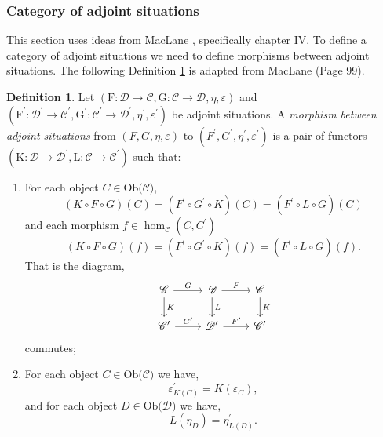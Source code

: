 \documentclass[11pt,a4paper]{article}
\theoremstyle{definition}
\newtheorem{definition}[thm]{Definition}
\newcommand\ho[3][]{\hom_{#1}(#2,#3)}
\newcommand\ob[1]{\mathrm{Ob(}#1\mathrm{)}}
\newcommand\cat[1]{\mathscr{#1}}
\newcommand\func[3]{\mathrm{#1}\colon#2\rightarrow#3}
\numberwithin{equation}{section}
\begin{document}
\subsubsection{Category of adjoint situations}
\label{sss:catofadjsitu} 
This section uses ideas from MacLane \cite{MacLane}, specifically chapter IV. To define a category of adjoint situations we need to define morphisms between adjoint situations. The following Definition \ref{def:morphadjsitu} is adapted from MacLane \cite{MacLane} (Page 99).

\begin{definition}
    \label{def:morphadjsitu}
    Let $(\func{F}{\cat{D}}{\cat{C}},\func{G}{\cat{C}}{\cat{D}},\eta,\varepsilon)$ and $(\func{F^\prime}{\cat{D^\prime}}{\cat{C^\prime}},\func{G^\prime}{\cat{C^\prime}}{\cat{D^\prime}},\eta^\prime,\varepsilon^\prime)$ be adjoint situations. A \emph{morphism between adjoint situations} from $(F,G,\eta,\varepsilon)$ to $(F^\prime,G^\prime,\eta^\prime,\varepsilon^\prime)$ is a pair of functors $(\func{K}{\cat{D}}{\cat{D^\prime}},\func{L}{\cat{C}}{\cat{C^\prime}})$ such that:
    \begin{enumerate}
        \item 
    For each object $C\in\ob{\cat{C}}$,
    \[(K\circ F\circ G)(C) = (F^\prime\circ G^\prime\circ K)(C) = (F^\prime\circ L\circ G)(C)\]
    and each morphism $f\in\ho[\cat{C}]{C}{C^\prime}$
    \[(K\circ F\circ G)(f) = (F^\prime\circ G^\prime\circ K)(f) = (F^\prime\circ L\circ G)(f).\]
    That is the diagram,
    \begin{equation}
    \label{dia:morphadjsitufunc}
        \begin{tikzcd}
            \cat{C} \arrow[r, "G"] \arrow[d, "K"] & \cat{D} \arrow[r, "F"] \arrow[d, "L"] & \cat{C} \arrow[d, "K"] \\
            \cat{C^\prime} \arrow[r, "G^\prime"] & \cat{D^\prime} \arrow[r, "F^\prime"] & \cat{C^\prime}
        \end{tikzcd}
    \end{equation}
    commutes;
    \item For each object $C\in\ob{\cat{C}}$ we have,
    \[\varepsilon^\prime _{K(C)} = K(\varepsilon_C),\]
    and for each object $D\in\ob{\cat{D}}$ we have,
    \[L(\eta_D) = \eta^\prime_{L(D)}.\]
    \end{enumerate}
\end{definition}
\end{document}
